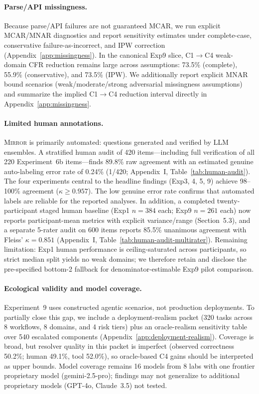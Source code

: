 \documentclass[10pt]{article}
\newcommand{\mirror}{\textsc{Mirror}}
\begin{document}
\paragraph{Parse/API missingness.}
Because parse/API failures are not guaranteed MCAR, we run explicit MCAR/MNAR
diagnostics and report sensitivity estimates under complete-case, conservative
failure-as-incorrect, and IPW correction (Appendix~\ref{app:missingness}). In the
canonical Exp9 slice, C1$\to$C4 weak-domain CFR reduction remains large across
assumptions: 73.5\% (complete), 55.9\% (conservative), and 73.5\% (IPW).
We additionally report explicit MNAR bound scenarios (weak/moderate/strong
adversarial missingness assumptions) and summarize the implied C1$\to$C4
reduction interval directly in Appendix~\ref{app:missingness}.

\paragraph{Limited human annotations.}
\mirror{} is primarily automated: questions generated and verified by LLM ensembles. A stratified human audit of 420 items---including full verification of all 220 Experiment~6b items---finds 89.8\% raw agreement with an estimated genuine auto-labeling error rate of 0.24\% (1/420; Appendix~I, Table~\ref{tab:human-audit}). The four experiments central to the headline findings (Exp3, 4, 5, 9) achieve 98--100\% agreement ($\kappa \geq 0.957$). The low genuine error rate confirms that automated labels are reliable for the reported analyses.
In addition, a completed twenty-participant staged human baseline (Exp1
$n=384$ each; Exp9 $n=261$ each) now reports participant-mean metrics with
explicit variance/range (Section~5.3), and a separate 5-rater audit on 600
items reports 85.5\% unanimous agreement with Fleiss' $\kappa=0.851$
(Appendix~I, Table~\ref{tab:human-audit-multirater}). Remaining limitation: Exp1 human
performance is ceiling-saturated across participants, so strict median
split yields no weak domains; we therefore retain and disclose the
pre-specified bottom-2 fallback for denominator-estimable Exp9 pilot
comparison.

\paragraph{Ecological validity and model coverage.}
Experiment~9 uses constructed agentic scenarios, not production deployments. To partially close this gap, we include a deployment-realism packet (320 tasks across 8 workflows, 8 domains, and 4 risk tiers) plus an oracle-realism sensitivity table over 540 escalated components (Appendix~\ref{app:deployment-realism}). Coverage is broad, but resolver quality in this packet is imperfect (observed correctness 50.2\%; human 49.1\%, tool 52.0\%), so oracle-based C4 gains should be interpreted as upper bounds. Model coverage remains 16 models from 8 labs with one frontier proprietary model (gemini-2.5-pro); findings may not generalize to additional proprietary models (GPT-4o, Claude~3.5) not tested.
\end{document}
